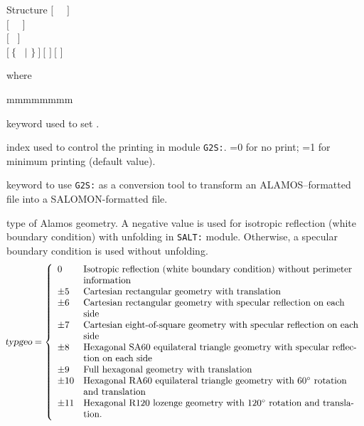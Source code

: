 \vskip -0.5cm

\begin{DataStructure}{Structure }
$[$~ ~$]$ \\
$[$~ ~$]$ \\
$[$~ $]$ \\
$[~\{$~ $|$  $\}~]~[$    $]~[$    $]$ \\
\moc{;}
\end{DataStructure}

\vskip -0.3cm

\noindent where
\begin{ListeDeDescription}{mmmmmmmm}

\item[\moc{EDIT}] keyword used to set .

\item[\dusa{iprint}] index used to control the printing in module {\tt G2S:}. =0 for no print; =1 for minimum printing (default value).

\item[\moc{ALAMOS}] keyword to use {\tt G2S:} as a conversion tool to transform an ALAMOS--formatted file into
a SALOMON-formatted file.

\item[\dusa{typgeo}] type of Alamos geometry. A negative value is used for isotropic reflection (white boundary condition) with unfolding in {\tt SALT:} module.
Otherwise, a specular boundary condition is used without unfolding.
\begin{displaymath}
\negthinspace \textsl{typgeo} = \left\{
\begin{array}{ll}
0 & \textrm{Isotropic reflection (white boundary condition) without perimeter}\\
& \textrm{information}\\
\pm 5 & \textrm{Cartesian rectangular geometry with translation}\\
\pm 6 & \textrm{Cartesian rectangular geometry with specular reflection on each}\\
& \textrm{side}\\
\pm 7 & \textrm{Cartesian eight-of-square geometry with specular reflection on each}\\
& \textrm{side}\\
\pm 8 & \textrm{Hexagonal SA60 equilateral triangle geometry with specular reflec-}\\
& \textrm{tion on each side}\\
\pm 9 & \textrm{Full hexagonal geometry with translation}\\
\pm 10 & \textrm{Hexagonal RA60 equilateral triangle geometry with } 60^\circ \textrm{ rotation}\\
& \textrm{and translation}\\
\pm 11 & \textrm{Hexagonal R120 lozenge geometry with } 120^\circ \textrm{ rotation and transla-}\\
& \textrm{tion.}
\end{array} \right.
\end{displaymath}


\end{ListeDeDescription}
